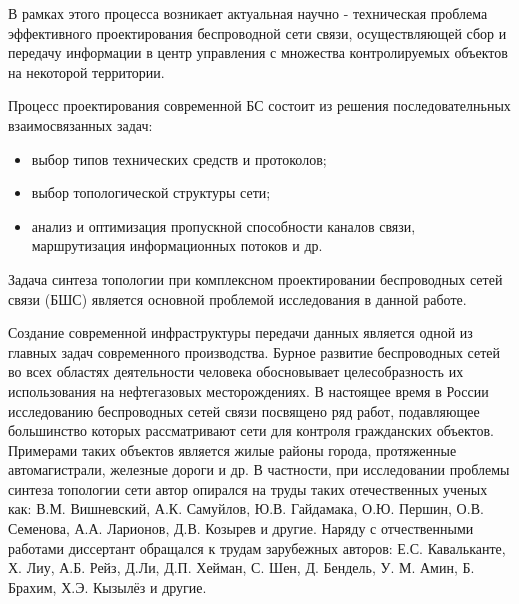 В рамках этого процесса возникает актуальная научно - техническая проблема эффективного проектирования беспроводной сети связи, осуществляющей сбор и передачу информации в центр  управления с множества контролируемых объектов на некоторой территории.   





Процесс проектирования современной БС состоит из решения последователньных взаимосвязанных задач:

\begin{itemize}
    \item выбор типов технических средств и протоколов;
    \item выбор топологической структуры сети;
    \item анализ и оптимизация пропускной способности каналов связи, маршрутизация информационных потоков и др.
\end{itemize}

Задача синтеза топологии при комплексном проектировании беспроводных сетей связи (БШС) является основной проблемой исследования в данной работе.


{\progress} Создание современной инфраструктуры передачи данных является одной из главных задач современного производства. Бурное развитие беспроводных сетей во всех областях деятельности человека обосновывает целесобразность их использования на нефтегазовых месторождениях. В настоящее время в России исследованию беспроводных сетей связи посвящено ряд работ, подавляющее большинство которых рассматривают сети для контроля гражданских объектов. Примерами таких объектов является жилые районы города, протяженные автомагистрали, железные дороги и др. В частности, при исследовании проблемы синтеза топологии сети автор опирался на труды таких отечественных ученых как: В.М. Вишневский, А.К. Самуйлов, Ю.В. Гайдамака, О.Ю. Першин, О.В. Семенова, А.А. Ларионов, Д.В. Козырев и другие.
Наряду с отчественными работами диссертант обращался к трудам зарубежных авторов: Е.С. Кавальканте, Х. Лиу, А.Б. Рейз, Д.Ли, Д.П. Хейман, С. Шен, Д. Бендель, У. М. Амин, Б. Брахим, Х.Э. Кызылёз и другие. 

